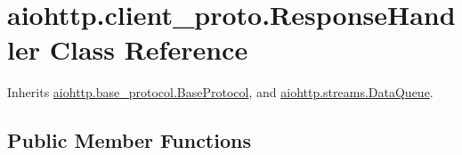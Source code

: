 \hypertarget{classaiohttp_1_1client__proto_1_1_response_handler}{}\section{aiohttp.\+client\+\_\+proto.\+Response\+Handler Class Reference}
\label{classaiohttp_1_1client__proto_1_1_response_handler}


Inherits \hyperlink{classaiohttp_1_1base__protocol_1_1_base_protocol}{aiohttp.\+base\+\_\+protocol.\+Base\+Protocol}, and \hyperlink{classaiohttp_1_1streams_1_1_data_queue}{aiohttp.\+streams.\+Data\+Queue}.

\subsection*{Public Member Functions}
